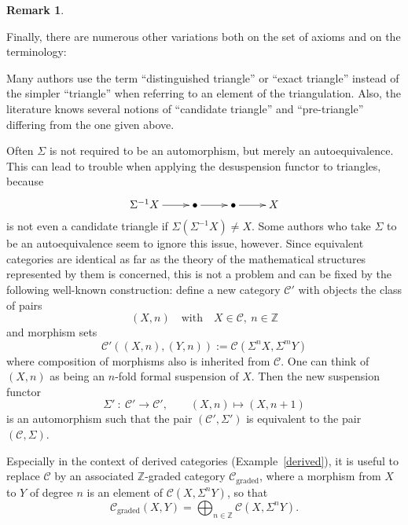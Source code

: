 \documentclass{amsproc}
\theoremstyle{definition}
\newtheorem{rem}[prop]{Remark}
\begin{document}
\begin{rem}
\begin{compactenum}
\item
Finally, there are numerous other variations both on the set of axioms and on the terminology: 
\begin{compactenum}
\item Many authors use the term ``distinguished triangle'' or ``exact triangle'' instead of the simpler ``triangle'' when referring to an element of the triangulation. Also, the literature knows several notions of ``candidate triangle'' and ``pre-triangle'' differing from the one given above.
\item Often $\Sigma$ is not required to be an automorphism, but merely an autoequivalence. This can lead to trouble when applying the desuspension functor to triangles, because 
\begin{displaymath}
\xymatrix{\Sigma^{-1}X\ar[r] & {\bullet}\ar[r] & {\bullet}\ar[r] & X}
\end{displaymath}
is not even a candidate triangle if $\Sigma(\Sigma^{-1}X)\neq X$. Some authors who take $\Sigma$ to be an autoequivalence seem to ignore this issue, however. Since equivalent categories are identical as far as the theory of the mathematical structures represented by them is concerned, this is not a problem and can be fixed by the following well-known construction: define a new category ${\mathcal{C}}'$ with objects the class of pairs 
\begin{displaymath}
(X,n)\quad\textrm{with}\quad X\in{\mathcal{C}},\:n\in{\mathbb{Z}}
\end{displaymath}
and morphism sets
\begin{displaymath}
{\mathcal{C}}'((X,n),(Y,n)):={\mathcal{C}}(\Sigma^n X,\Sigma^m Y)
\end{displaymath}
where composition of morphisms also is inherited from ${\mathcal{C}}$.
One can think of $(X,n)$ as being an $n$-fold formal suspension of $X$. Then the new suspension functor
\[
\Sigma'\: :\: {\mathcal{C}}'{\longrightarrow}{\mathcal{C}}',\qquad (X,n)\longmapsto (X,n+1)
\]
is an automorphism such that the pair $({\mathcal{C}}',\Sigma')$ is equivalent to the pair $({\mathcal{C}},\Sigma)$.
\item Especially in the context of derived categories (Example~\ref{derived}), it is useful to replace ${\mathcal{C}}$ by an associated ${\mathbb{Z}}$-graded category ${\mathcal{C}}_\textrm{graded}$, where a morphism from $X$ to $Y$ of degree $n$ is an element of ${\mathcal{C}}(X,\Sigma^nY)$, so that
\begin{displaymath}
{\mathcal{C}}_\textrm{graded}(X,Y)=\bigoplus_{n\in{\mathbb{Z}}}{\mathcal{C}}(X,\Sigma^n Y).

\end{displaymath}
\end{compactenum}
\end{compactenum}
\end{rem}
\end{document}
